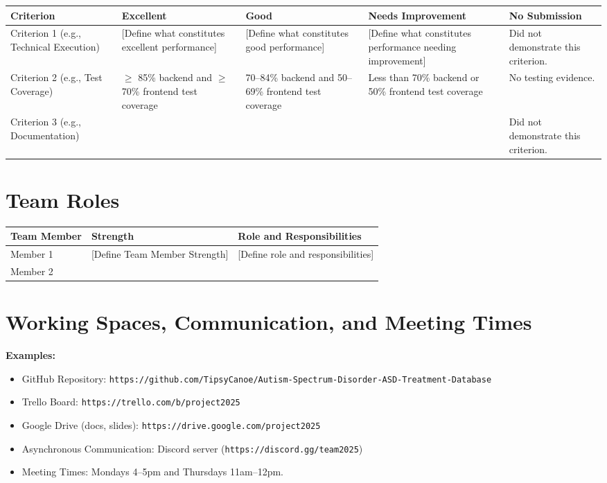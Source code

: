 \documentclass{article}
\begin{document}
\begin{tabularx}{\textwidth}{|X|X|X|X|X|}
    \hline
    \textbf{Criterion} & \textbf{Excellent} & \textbf{Good} & \textbf{Needs Improvement} & \textbf{No Submission}\\
    \hline
  Criterion 1 (e.g., Technical Execution) & [Define what constitutes excellent performance] & [Define what constitutes good performance] & [Define what constitutes performance needing improvement] & Did not demonstrate this criterion. \\
    \hline     
      Criterion 2 (e.g., Test Coverage) & $\geq$ 85\% backend and $\geq$ 70\% frontend test coverage & 70--84\% backend and 50--69\% frontend test coverage & Less than 70\% backend or 50\% frontend test coverage & No testing evidence. \\
    \hline
    Criterion 3 (e.g., Documentation) &  &  &  & Did not demonstrate this criterion. \\
    \hline
    
\end{tabularx}



\section*{Team Roles}


\begin{tabularx}{\textwidth}{|X|X|X|}
    \hline
    \textbf{Team Member} & \textbf{Strength} & \textbf{Role and Responsibilities} \\
    \hline
    Member 1 & [Define Team Member Strength] & [Define role and responsibilities] \\
    \hline
    Member 2 & & \\
    \hline
\end{tabularx}

\section*{Working Spaces, Communication, and Meeting Times}
\textbf{Examples:}  
\begin{itemize}
    \item GitHub Repository: \texttt{https://github.com/TipsyCanoe/Autism-Spectrum-Disorder-ASD-Treatment-Database}  
    \item Trello Board: \texttt{https://trello.com/b/project2025}  
    \item Google Drive (docs, slides): \texttt{https://drive.google.com/project2025}  
    \item Asynchronous Communication: Discord server (\texttt{https://discord.gg/team2025})
    \item Meeting Times: Mondays 4--5pm and Thursdays 11am--12pm.  
\end{itemize}
\end{document}
